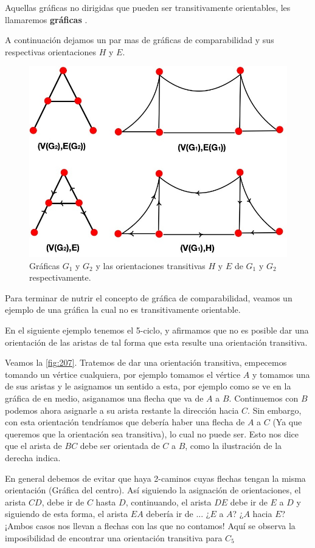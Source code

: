 Aquellas gráficas no dirigidas que pueden ser transitivamente orientables, les llamaremos \textbf{gráficas} .

A continuación dejamos un par mas de gráficas de comparabilidad y sus respectivas orientaciones $H$ y $E$.

\begin{figure}[H]
  \centering
  \includegraphics[width=0.6
  \textwidth]{recursos/capturas/206.jpg}
  \caption{Gráficas $G_1$ y $G_2$ y las orientaciones transitivas $H$ y $E$ de $G_1$ y $G_2$ respectivamente.}
  \label{fig:206}
\end{figure}

Para terminar de nutrir el concepto de gráfica de comparabilidad, veamos un ejemplo de una gráfica la cual no es transitivamente orientable.

En el siguiente ejemplo tenemos el 5-ciclo, y afirmamos que no es posible dar una orientación de las aristas de tal forma que esta resulte una orientación transitiva.
    
Veamos la \cref{fig:207}.
Tratemos de dar una orientación transitiva, empecemos tomando un vértice cualquiera, por ejemplo tomamos el vértice $A$ y tomamos una de sus aristas y le asignamos un sentido a esta, por ejemplo como se ve en la gráfica de en medio, asiganamos una flecha que va de $A$ a $B$.
Continuemos con $B$ podemos ahora asignarle a su arista restante la dirección hacia $C$. Sin embargo, con esta orientación tendríamos que debería haber una flecha de $A$ a $C$ (Ya que queremos que la orientación sea transitiva), lo cual no puede ser. Esto nos dice que el arista de $BC$ debe ser orientada de $C$ a $B$, como la ilustración de la derecha indica.
    
En general debemos de evitar que haya 2-caminos cuyas  flechas tengan la misma orientación (Gráfica del centro). Así siguiendo la asignación de orientaciones, el arista $CD$, debe ir de $C$ hasta $D$, continuando, el arista $DE$ debe ir de $E$ a $D$ y siguiendo de esta forma, el arista $EA$ debería ir de ... ¿$E$ a $A$? ¿$A$ hacia $E$? ¡Ambos casos nos llevan a flechas con las que no contamos!
Aquí se observa la imposibilidad de encontrar una orientación transitiva para $C_5$


